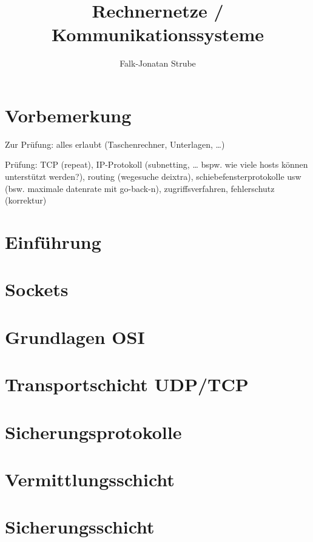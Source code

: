 \documentclass{scrreprt}
\title{Rechnernetze / Kommunikationssysteme}
\author{Falk-Jonatan Strube}
\begin{document}
\maketitle
\tableofcontents
{}

\chapter*{Vorbemerkung}

Zur Prüfung: alles erlaubt (Taschenrechner, Unterlagen, …)

Prüfung: TCP (repeat), IP-Protokoll (subnetting, … bspw. wie viele hosts können unterstützt werden?), routing (wegesuche deixtra), schiebefensterprotokolle usw (bsw. maximale datenrate mit go-back-n), zugriffsverfahren, fehlerschutz (korrektur)

\chapter{Einführung}


\chapter{Sockets}


\chapter{Grundlagen OSI}


\chapter{Transportschicht UDP/TCP}


\chapter{Sicherungsprotokolle}


\chapter{Vermittlungsschicht}


\chapter{Sicherungsschicht}

\end{document}
